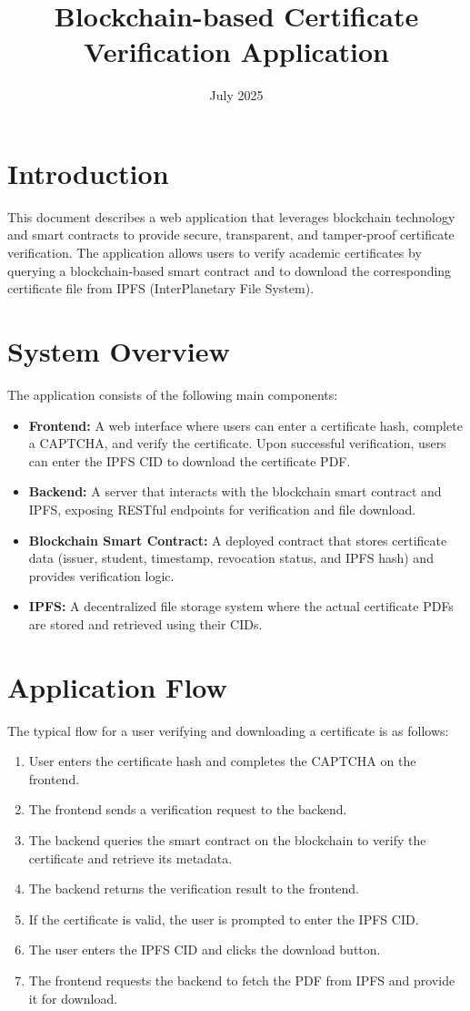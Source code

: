 \documentclass{article}
\title{Blockchain-based Certificate Verification Application}
\author{}
\date{July 2025}
\begin{document}
\maketitle

\section{Introduction}
This document describes a web application that leverages blockchain technology and smart contracts to provide secure, transparent, and tamper-proof certificate verification. The application allows users to verify academic certificates by querying a blockchain-based smart contract and to download the corresponding certificate file from IPFS (InterPlanetary File System).

\section{System Overview}
The application consists of the following main components:
\begin{itemize}
    \item \textbf{Frontend:} A web interface where users can enter a certificate hash, complete a CAPTCHA, and verify the certificate. Upon successful verification, users can enter the IPFS CID to download the certificate PDF.
    \item \textbf{Backend:} A server that interacts with the blockchain smart contract and IPFS, exposing RESTful endpoints for verification and file download.
    \item \textbf{Blockchain Smart Contract:} A deployed contract that stores certificate data (issuer, student, timestamp, revocation status, and IPFS hash) and provides verification logic.
    \item \textbf{IPFS:} A decentralized file storage system where the actual certificate PDFs are stored and retrieved using their CIDs.
\end{itemize}

\section{Application Flow}
The typical flow for a user verifying and downloading a certificate is as follows:
\begin{enumerate}
    \item User enters the certificate hash and completes the CAPTCHA on the frontend.
    \item The frontend sends a verification request to the backend.
    \item The backend queries the smart contract on the blockchain to verify the certificate and retrieve its metadata.
    \item The backend returns the verification result to the frontend.
    \item If the certificate is valid, the user is prompted to enter the IPFS CID.
    \item The user enters the IPFS CID and clicks the download button.
    \item The frontend requests the backend to fetch the PDF from IPFS and provide it for download.
\end{enumerate}
\end{document}
